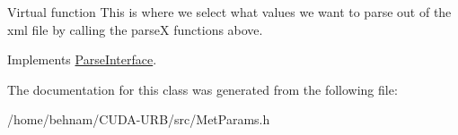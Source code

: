 Virtual function This is where we select what values we want to parse out of the xml file by calling the parseX functions above. 

Implements \hyperlink{classParseInterface_afca32108192ba0997c9e5a78189b0cbc}{Parse\+Interface}.



The documentation for this class was generated from the following file\+:\begin{DoxyCompactItemize}
\item 
/home/behnam/\+C\+U\+D\+A-\/\+U\+R\+B/src/Met\+Params.\+h\end{DoxyCompactItemize}
